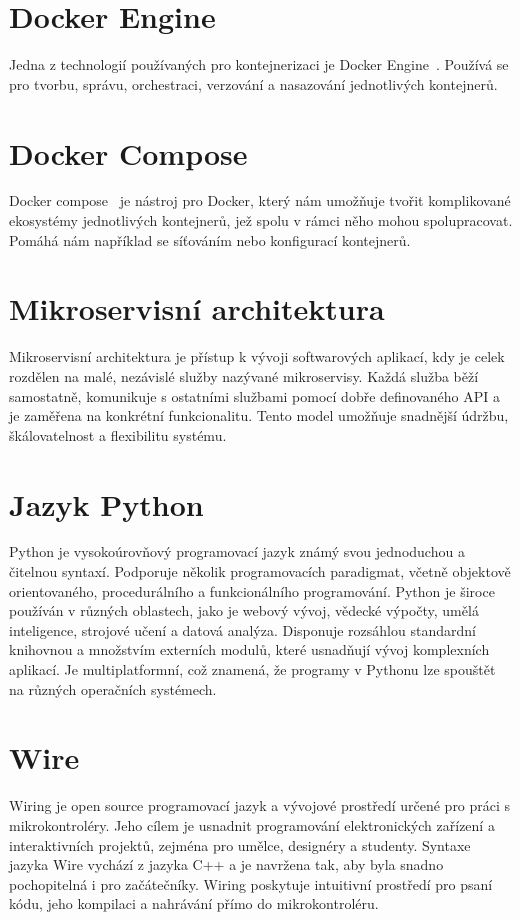 \section{Docker Engine}\label{sec:docker-engine}
Jedna z technologií používaných pro kontejnerizaci je Docker Engine~\cite{kontejnerizace-docker}.
Používá se pro tvorbu, správu, orchestraci, verzování a nasazování jednotlivých kontejnerů.

\section{Docker Compose}\label{sec:docker-compose}
Docker compose~\cite{kontejnerizace-docker-compose} je nástroj pro Docker, který nám umožňuje tvořit komplikované ekosystémy jednotlivých kontejnerů, jež spolu v rámci něho mohou spolupracovat.
Pomáhá nám například se síťováním nebo konfigurací kontejnerů.

\section{Mikroservisní architektura}\label{sec:microservice-architecture}
Mikroservisní architektura je přístup k vývoji softwarových aplikací, kdy je celek rozdělen na malé, nezávislé služby nazývané mikroservisy.
Každá služba běží samostatně, komunikuje s ostatními službami pomocí dobře definovaného API a je zaměřena na konkrétní funkcionalitu.
Tento model umožňuje snadnější údržbu, škálovatelnost a flexibilitu systému.

\section{Jazyk Python}\label{sec:python}
Python je vysokoúrovňový programovací jazyk známý svou jednoduchou a čitelnou syntaxí.
Podporuje několik programovacích paradigmat, včetně objektově orientovaného, procedurálního a funkcionálního programování.
Python je široce používán v různých oblastech, jako je webový vývoj, vědecké výpočty, umělá inteligence, strojové učení a datová analýza.
Disponuje rozsáhlou standardní knihovnou a množstvím externích modulů, které usnadňují vývoj komplexních aplikací.
Je multiplatformní, což znamená, že programy v Pythonu lze spouštět na různých operačních systémech.

\section{Wire}\label{sec:wiring}
Wiring je open source programovací jazyk a vývojové prostředí určené pro práci s mikrokontroléry.
Jeho cílem je usnadnit programování elektronických zařízení a interaktivních projektů, zejména pro umělce, designéry a studenty.
Syntaxe jazyka Wire vychází z jazyka C++ a je navržena tak, aby byla snadno pochopitelná i pro začátečníky.
Wiring poskytuje intuitivní prostředí pro psaní kódu, jeho kompilaci a nahrávání přímo do mikrokontroléru.

